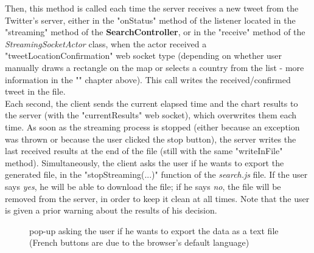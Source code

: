 \documentclass[a4paper,11pt]{report}
\begin{document}
Then, this method is called each time the server receives a new tweet from the Twitter's server, either in the "onStatus" method of the listener located in the "streaming" method of the \textbf{SearchController}, or in the "receive" method of the \emph{StreamingSocketActor} class, when the actor received a "tweetLocationConfirmation" web socket type (depending on whether user manually draws a rectangle on the map or selects a country from the list - more information in the "" chapter above). This call writes the received/confirmed tweet in the file.\\

Each second, the client sends the current elapsed time and the chart results to the server (with the "currentResults" web socket), which overwrites them each time. As soon as the streaming process is stopped (either because an exception was thrown or because the user clicked the stop button), the server writes the last received results at the end of the file (still with the same "writeInFile" method). Simultaneously, the client asks the user if he wants to export the generated file, in the "stopStreaming(...)" function of the \emph{search.js} file. If the user says \emph{yes}, he will be able to download the file; if he says \emph{no}, the file will be removed from the server, in order to keep it clean at all times. Note that the user is given a prior warning about the results of his decision.
\begin{figure}[H]
\vspace{-5pt}
\begin{center}
\vspace{-5pt}
\caption{pop-up asking the user if he wants to export the data as a text file (French buttons are due to the browser's default language)}
\end{center}
\end{figure}
\newpage
\end{document}
